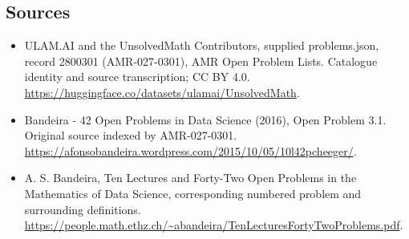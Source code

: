 \documentclass[11pt,a4paper]{article}
\begin{document}
\subsection{Sources}
\begin{itemize}
\item[S1] ULAM.AI and the UnsolvedMath Contributors, supplied problems.json, record 2800301 (AMR-027-0301), AMR Open Problem Lists. Catalogue identity and source transcription; CC BY 4.0.
\url{https://huggingface.co/datasets/ulamai/UnsolvedMath}.
\item[S2] Bandeira - 42 Open Problems in Data Science (2016), Open Problem 3.1. Original source indexed by AMR-027-0301.
\url{https://afonsobandeira.wordpress.com/2015/10/05/10l42pcheeger/}.
\item[S3] A. S. Bandeira, Ten Lectures and Forty-Two Open Problems in the Mathematics of Data Science, corresponding numbered problem and surrounding definitions.
\url{https://people.math.ethz.ch/~abandeira/TenLecturesFortyTwoProblems.pdf}.
\end{itemize}
\end{document}
